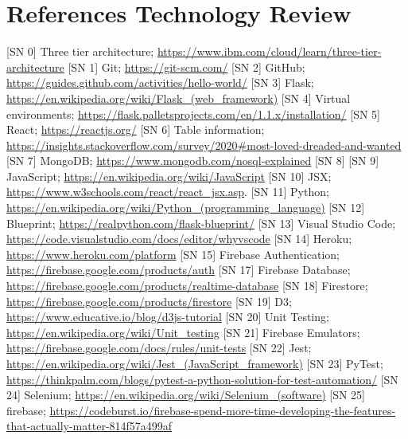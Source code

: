 \chapter{References Technology Review}
[SN 0] Three tier architecture; \url{https://www.ibm.com/cloud/learn/three-tier-architecture}
[SN 1] Git; \url{https://git-scm.com/}
[SN 2] GitHub; \url{https://guides.github.com/activities/hello-world/}
[SN 3] Flask; \url{https://en.wikipedia.org/wiki/Flask_(web_framework)}
[SN 4] Virtual environments; \url{https://flask.palletsprojects.com/en/1.1.x/installation/}
[SN 5] React;  \url{https://reactjs.org/}
[SN 6] Table information; \url{https://insights.stackoverflow.com/survey/2020#most-loved-dreaded-and-wanted}
[SN 7] MongoDB; \url{https://www.mongodb.com/nosql-explained}
[SN 8]
[SN 9] JavaScript; \url{https://en.wikipedia.org/wiki/JavaScript}
[SN 10] JSX; \url{https://www.w3schools.com/react/react_jsx.asp}.
[SN 11] Python; \url{https://en.wikipedia.org/wiki/Python_(programming_language)}
[SN 12] Blueprint; \url{https://realpython.com/flask-blueprint/}
[SN 13] Visual Studio Code; \url{https://code.visualstudio.com/docs/editor/whyvscode}
[SN 14] Heroku; \url{https://www.heroku.com/platform}
[SN 15] Firebase Authentication; \url{https://firebase.google.com/products/auth}
[SN 17] Firebase Database; \url{https://firebase.google.com/products/realtime-database}
[SN 18] Firestore; \url{https://firebase.google.com/products/firestore}
[SN 19] D3; \url{https://www.educative.io/blog/d3js-tutorial}
[SN 20] Unit Testing; \url{https://en.wikipedia.org/wiki/Unit_testing}
[SN 21] Firebase Emulators; \url{https://firebase.google.com/docs/rules/unit-tests}
[SN 22] Jest; \url{https://en.wikipedia.org/wiki/Jest_(JavaScript_framework)}
[SN 23] PyTest; \url{https://thinkpalm.com/blogs/pytest-a-python-solution-for-test-automation/}
[SN 24] Selenium; \url{https://en.wikipedia.org/wiki/Selenium_(software)}
[SN 25] firebase; \url{https://codeburst.io/firebase-spend-more-time-developing-the-features-that-actually-matter-814f57a499af}
